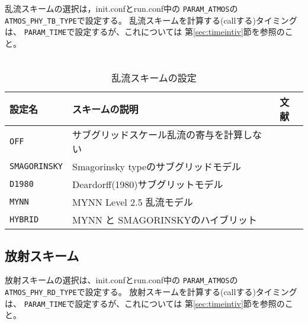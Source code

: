 乱流スキームの選択は，init.confとrun.conf中の
\verb|PARAM_ATMOS|の\verb|ATMOS_PHY_TB_TYPE|で設定する。
乱流スキームを計算する(callする)タイミングは、
\verb|PARAM_TIME|で設定するが、これについては
第\ref{sec:timeintiv}節を参照のこと。\\

\\

\begin{table}[h]
\begin{center}
  \caption{乱流スキームの設定}
  \label{tab:nml_atm_tb}
  \begin{tabularx}{150mm}{lXX} \hline
    \rowcolor[gray]{0.9}  設定名 & スキームの説明 & 文献\\ \hline
      \verb|OFF|          & サブグリッドスケール乱流の寄与を計算しない &  \\
      \verb|SMAGORINSKY|  & Smagorinsky typeのサブグリッドモデル    & \citet{smagorinsky_1963,lilly_1962,Brown_etal_1994,Scotti_1993} \\
      \verb|D1980|        & Deardorff(1980)サブグリットモデル &\citet{Deardorff_1980} \\
      \verb|MYNN|         & MYNN Level 2.5 乱流モデル & \citet{my_1982,nakanishi_2004} \\
      \verb|HYBRID|       & MYNN と SMAGORINSKYのハイブリット &  \\
    \hline
  \end{tabularx}
\end{center}
\end{table}




\subsection{放射スキーム} \label{sec:basic_radiation}
放射スキームの選択は、init.confとrun.conf中の
\verb|PARAM_ATMOS|の\verb|ATMOS_PHY_RD_TYPE|で設定する。
放射スキームを計算する(callする)タイミングは、
\verb|PARAM_TIME|で設定するが、これについては
第\ref{sec:timeintiv}節を参照のこと。\\

